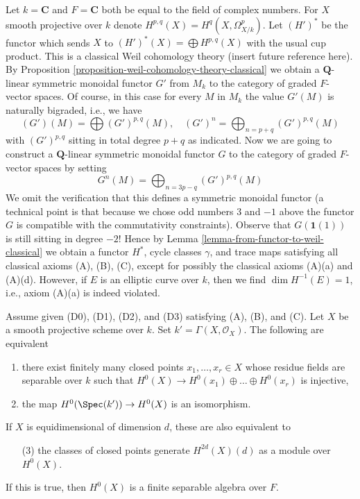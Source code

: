 \begin{example}
\label{example-weird-weil}
Let $k = \mathbf{C}$ and $F = \mathbf{C}$ both be equal to the field
of complex numbers. For $X$ smooth projective over $k$ denote
$H^{p, q}(X) = H^q(X, \Omega^p_{X/k})$. Let $(H')^*$ be the functor
which sends $X$ to $(H')^*(X) = \bigoplus H^{p, q}(X)$ with the
usual cup product.
This is a classical Weil cohomology theory (insert future reference here).
By Proposition \ref{proposition-weil-cohomology-theory-classical}
we obtain a $\mathbf{Q}$-linear symmetric monoidal functor $G'$ from $M_k$
to the category of graded $F$-vector spaces. Of course, in this case
for every $M$ in $M_k$ the value $G'(M)$ is naturally bigraded, i.e.,
we have
$$
(G')(M) = \bigoplus (G')^{p, q}(M),\quad
(G')^n = \bigoplus\nolimits_{n = p + q} (G')^{p, q}(M)
$$
with $(G')^{p, q}$ sitting in total degree $p + q$ as indicated.
Now we are going to construct a $\mathbf{Q}$-linear symmetric monoidal functor
$G$ to the category of graded $F$-vector spaces by setting
$$
G^n(M) = \bigoplus\nolimits_{n = 3p - q} (G')^{p, q}(M)
$$
We omit the verification that this defines a symmetric monoidal
functor (a technical point is that because we chose odd numbers
$3$ and $-1$ above the functor $G$ is compatible with the
commutativity constraints).
Observe that $G(\mathbf{1}(1))$ is still sitting in degree $-2$!
Hence by Lemma \ref{lemma-from-functor-to-weil-classical}
we obtain a functor $H^*$, cycle classes $\gamma$, and trace maps
satisfying all classical axioms (A), (B), (C), except for possibly
the classical axioms (A)(a) and (A)(d).
However, if $E$ is an elliptic curve over $k$, then we find
$\dim H^{-1}(E) = 1$, i.e., axiom (A)(a) is indeed violated.
\end{example}

\begin{lemma}
\label{lemma-H-0-separable}
Assume given (D0), (D1), (D2), and (D3) satisfying (A), (B), and (C).
Let $X$ be a smooth projective scheme over $k$.
Set $k' = \Gamma(X, \mathcal{O}_X)$. The following are equivalent
\begin{enumerate}
\item there exist finitely many closed points $x_1, \ldots, x_r \in X$
whose residue fields are separable over $k$ such that
$H^0(X) \to H^0(x_1) \oplus \ldots \oplus H^0(x_r)$ is injective,
\item the map $H^0(\Spec(k')) \to H^0(X)$ is an isomorphism.
\end{enumerate}
If $X$ is equidimensional of dimension $d$, these are also equivalent to
\begin{enumerate}
\item[(3)] the classes of closed points generate $H^{2d}(X)(d)$
as a module over $H^0(X)$.
\end{enumerate}
If this is true, then $H^0(X)$ is a finite separable algebra over $F$.
\end{lemma}

